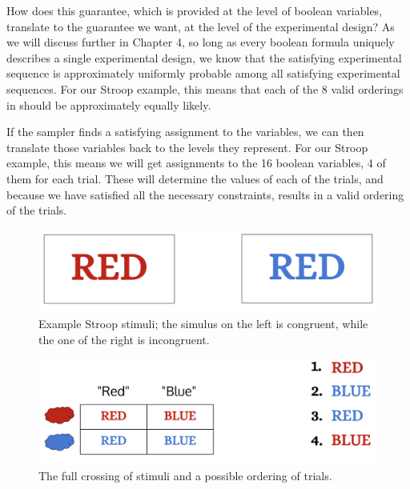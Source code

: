 How does this guarantee, which is provided at the level of boolean variables, translate to the guarantee we want, at the level of the experimental design? As we will discuss further in Chapter 4, so long as every boolean formula uniquely describes a single experimental design, we know that the satisfying experimental sequence is approximately uniformly probable among all satisfying experimental sequences. For our Stroop example, this means that each of the 8 valid orderings in  should be approximately equally likely.

If the sampler finds a satisfying assignment to the variables, we can then translate those variables back to the levels they represent. For our Stroop example, this means we will get assignments to the 16 boolean variables, 4 of them for each trial. These will determine the values of each of the trials, and because we have satisfied all the necessary constraints, results in a valid ordering of the trials.


\begin{figure}
    \centering
    \centerline{\includegraphics[origin=c,width=12cm]{fig_red_and_blue}}
    \caption{Example Stroop stimuli; the simulus on the left is congruent, while the one of the right is incongruent.}%
    \label{fig:stroop_example}%
\end{figure}


\begin{figure}
  \centerline{\includegraphics[origin=c,width=12cm]{fig_simple_full_crossing_and_seq}}
    \caption{The full crossing of stimuli and a possible ordering of trials.}%
    \label{fig:simple_full_crossing}%
\end{figure}

